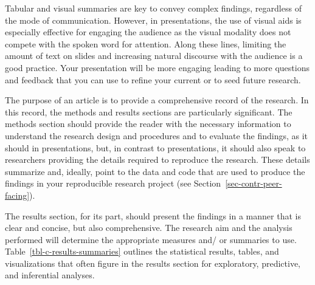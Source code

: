 \documentclass[
  letterpaper,
]{latex/krantz}
\theoremstyle{definition}
\theoremstyle{remark}
\begin{document}
Tabular and visual summaries are key to convey complex findings,
regardless of the mode of communication. However, in presentations, the
use of visual aids is especially effective for engaging the audience as
the visual modality does not compete with the spoken word for attention.
Along these lines, limiting the amount of text on slides and increasing
natural discourse with the audience is a good practice. Your
presentation will be more engaging leading to more questions and
feedback that you can use to refine your current or to seed future
research.

The purpose of an article is to provide a comprehensive record of the
research. In this record, the methods and results sections are
particularly significant. The methods section should provide the reader
with the necessary information to understand the research design and
procedures and to evaluate the findings, as it should in presentations,
but, in contrast to presentations, it should also speak to researchers
providing the details required to reproduce the research. These details
summarize and, ideally, point to the data and code that are used to
produce the findings in your reproducible research project (see
Section~\ref{sec-contr-peer-facing}).

The results section, for its part, should present the findings in a
manner that is clear and concise, but also comprehensive. The research
aim and the analysis performed will determine the appropriate measures
and/ or summaries to use. Table~\ref{tbl-c-results-summaries} outlines
the statistical results, tables, and visualizations that often figure in
the results section for exploratory, predictive, and inferential
analyses.
\end{document}

